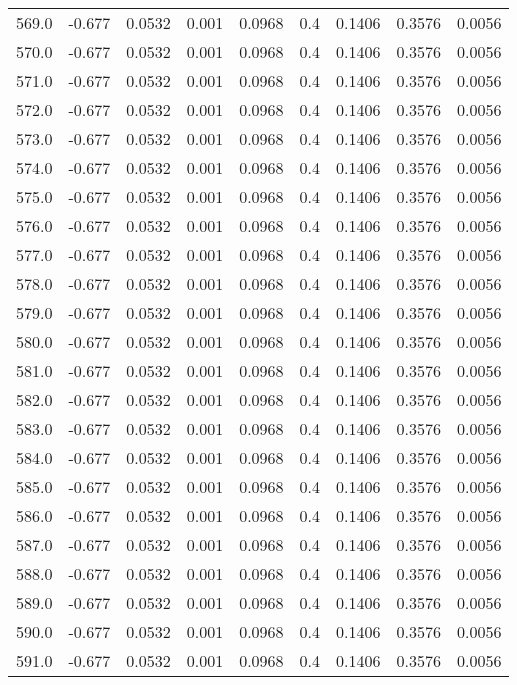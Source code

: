 \begin{longtable}{lrrrrrrrr}
569.0 & -0.677 & 0.0532 & 0.001 & 0.0968 & 0.4 & 0.1406 & 0.3576 & 0.0056 \\
570.0 & -0.677 & 0.0532 & 0.001 & 0.0968 & 0.4 & 0.1406 & 0.3576 & 0.0056 \\
571.0 & -0.677 & 0.0532 & 0.001 & 0.0968 & 0.4 & 0.1406 & 0.3576 & 0.0056 \\
572.0 & -0.677 & 0.0532 & 0.001 & 0.0968 & 0.4 & 0.1406 & 0.3576 & 0.0056 \\
573.0 & -0.677 & 0.0532 & 0.001 & 0.0968 & 0.4 & 0.1406 & 0.3576 & 0.0056 \\
574.0 & -0.677 & 0.0532 & 0.001 & 0.0968 & 0.4 & 0.1406 & 0.3576 & 0.0056 \\
575.0 & -0.677 & 0.0532 & 0.001 & 0.0968 & 0.4 & 0.1406 & 0.3576 & 0.0056 \\
576.0 & -0.677 & 0.0532 & 0.001 & 0.0968 & 0.4 & 0.1406 & 0.3576 & 0.0056 \\
577.0 & -0.677 & 0.0532 & 0.001 & 0.0968 & 0.4 & 0.1406 & 0.3576 & 0.0056 \\
578.0 & -0.677 & 0.0532 & 0.001 & 0.0968 & 0.4 & 0.1406 & 0.3576 & 0.0056 \\
579.0 & -0.677 & 0.0532 & 0.001 & 0.0968 & 0.4 & 0.1406 & 0.3576 & 0.0056 \\
580.0 & -0.677 & 0.0532 & 0.001 & 0.0968 & 0.4 & 0.1406 & 0.3576 & 0.0056 \\
581.0 & -0.677 & 0.0532 & 0.001 & 0.0968 & 0.4 & 0.1406 & 0.3576 & 0.0056 \\
582.0 & -0.677 & 0.0532 & 0.001 & 0.0968 & 0.4 & 0.1406 & 0.3576 & 0.0056 \\
583.0 & -0.677 & 0.0532 & 0.001 & 0.0968 & 0.4 & 0.1406 & 0.3576 & 0.0056 \\
584.0 & -0.677 & 0.0532 & 0.001 & 0.0968 & 0.4 & 0.1406 & 0.3576 & 0.0056 \\
585.0 & -0.677 & 0.0532 & 0.001 & 0.0968 & 0.4 & 0.1406 & 0.3576 & 0.0056 \\
586.0 & -0.677 & 0.0532 & 0.001 & 0.0968 & 0.4 & 0.1406 & 0.3576 & 0.0056 \\
587.0 & -0.677 & 0.0532 & 0.001 & 0.0968 & 0.4 & 0.1406 & 0.3576 & 0.0056 \\
588.0 & -0.677 & 0.0532 & 0.001 & 0.0968 & 0.4 & 0.1406 & 0.3576 & 0.0056 \\
589.0 & -0.677 & 0.0532 & 0.001 & 0.0968 & 0.4 & 0.1406 & 0.3576 & 0.0056 \\
590.0 & -0.677 & 0.0532 & 0.001 & 0.0968 & 0.4 & 0.1406 & 0.3576 & 0.0056 \\
591.0 & -0.677 & 0.0532 & 0.001 & 0.0968 & 0.4 & 0.1406 & 0.3576 & 0.0056 \\

\end{longtable}
